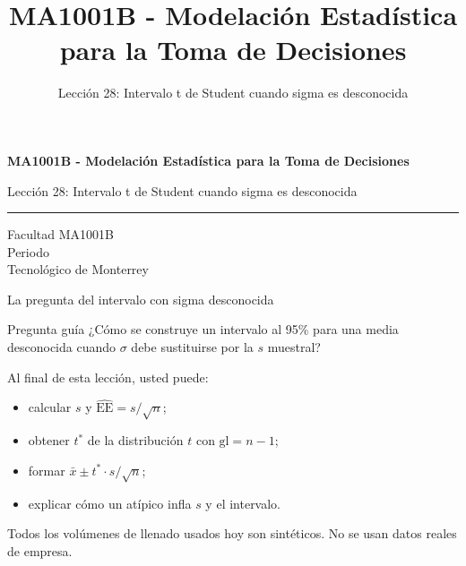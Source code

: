 \documentclass[aspectratio=169,10pt,spanish]{beamer}
\title{MA1001B - Modelación Estadística para la Toma de Decisiones}
\subtitle{Lección 28: Intervalo t de Student cuando sigma es desconocida}
\author{}
\institute{Tecnol\'ogico de Monterrey}
\date{}
\begin{document}
\begin{frame}[plain]
  \vspace{1.2cm}
  {\Large\bfseries MA1001B - Modelación Estadística para la Toma de Decisiones\par}
  \vspace{0.7cm}
  {\large Lección 28: Intervalo t de Student cuando sigma es desconocida\par}
  \vspace{0.7cm}
  {\color{TecRojo}\rule{\textwidth}{1.2pt}}
  \vspace{0.8cm}

  Facultad MA1001B\\[0.3cm]
  Periodo\\[0.3cm]
  Tecnol\'ogico de Monterrey
\end{frame}

\begin{frame}{La pregunta del intervalo con sigma desconocida}
  \begin{alertblock}{Pregunta guía}
    ¿Cómo se construye un intervalo al 95\% para una media desconocida
    cuando $\sigma$ debe sustituirse por la $s$ muestral?
  \end{alertblock}

  \vspace{0.6em}
  Al final de esta lección, usted puede:
  \begin{itemize}
    \item calcular $s$ y $\widehat{\mathrm{EE}}=s/\sqrt{n}$;
    \item obtener $t^{*}$ de la distribución $t$ con $\mathrm{gl}=n-1$;
    \item formar $\bar{x}\pm t^{*}\cdot s/\sqrt{n}$;
    \item explicar cómo un atípico infla $s$ y el intervalo.
  \end{itemize}

  \vfill
  \scriptsize Todos los volúmenes de llenado usados hoy son sintéticos. No se usan datos reales de empresa.
\end{frame}
\end{document}
